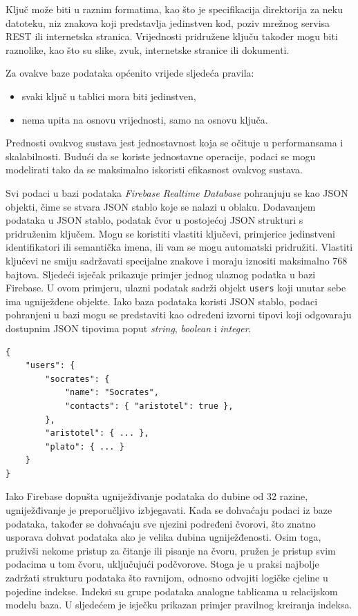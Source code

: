 Ključ može biti u raznim formatima, kao što je specifikacija direktorija za neku datoteku, niz znakova koji predstavlja jedinstven kod, poziv mrežnog servisa REST ili internetska stranica. Vrijednosti pridružene ključu također mogu biti raznolike, kao što su slike, zvuk, internetske stranice ili dokumenti.

Za ovakve baze podataka općenito vrijede sljedeća pravila:
\begin{itemize}
	\item svaki ključ u tablici mora biti jedinstven,
	\item nema upita na osnovu vrijednosti, samo na osnovu ključa.
\end{itemize}

Prednosti ovakvog sustava jest jednostavnost koja se očituje u performansama i skalabilnosti. Budući da se koriste jednostavne operacije, podaci se mogu modelirati tako da se maksimalno iskoristi efikasnost ovakvog sustava.

Svi podaci u bazi podataka \textit{Firebase Realtime Database} pohranjuju se kao JSON objekti, čime se stvara JSON stablo koje se nalazi u oblaku. Dodavanjem podataka u JSON stablo, podatak čvor u postojećoj JSON strukturi s pridruženim ključem. Mogu se koristiti vlastiti ključevi, primjerice jedinstveni identifikatori ili semantička imena, ili vam se mogu automatski pridružiti. Vlastiti ključevi ne smiju sadržavati specijalne znakove i moraju iznositi maksimalno 768 bajtova. Sljedeći isječak prikazuje primjer jednog ulaznog podatka u bazi Firebase. U ovom primjeru, ulazni podatak sadrži objekt \lstinline|users| koji unutar sebe ima ugniježđene objekte. Iako baza podataka koristi JSON stablo, podaci pohranjeni u bazi mogu se predstaviti kao određeni izvorni tipovi koji odgovaraju dostupnim JSON tipovima poput \textit{string}, \textit{boolean} i \textit{integer}.

\begin{lstlisting}[caption={Primjer jednog podatka u bazi Firebase}]
{
	"users": {
		"socrates": {
			"name": "Socrates",
			"contacts": { "aristotel": true },
		},
		"aristotel": { ... },
		"plato": { ... }
	}
}
\end{lstlisting}

Iako Firebase dopušta ugniježđivanje podataka do dubine od 32 razine, ugniježđivanje je preporučljivo izbjegavati. Kada se dohvaćaju podaci iz baze podataka, također se dohvaćaju sve njezini podređeni čvorovi, što znatno usporava dohvat podataka ako je velika dubina ugniježđenosti. Osim toga, pruživši nekome pristup za čitanje ili pisanje na čvoru, pružen je pristup svim podacima u tom čvoru, uključujući podčvorove. Stoga je u praksi najbolje zadržati strukturu podataka što ravnijom, odnosno odvojiti logičke cjeline u pojedine indekse. Indeksi su grupe podataka analogne tablicama u relacijskom modelu baza. U sljedećem je isječku prikazan primjer pravilnog kreiranja indeksa.  

